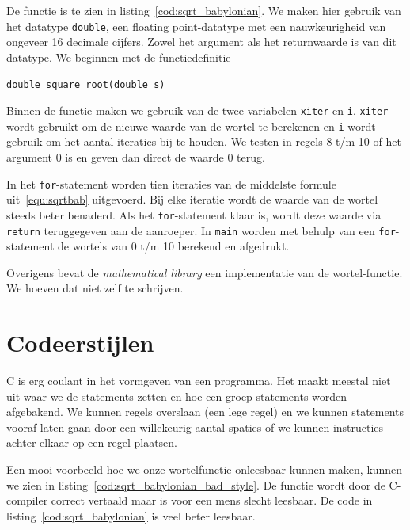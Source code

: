 De functie is te zien in listing~\ref{cod:sqrt_babylonian}. We maken hier gebruik van het datatype \texttt{double}, een floating point-datatype met een nauwkeurigheid van ongeveer 16 decimale cijfers. Zowel het argument als het returnwaarde is van dit datatype. We beginnen met de functiedefinitie

\hspace*{1em}\texttt{double square\_root(double s)}

Binnen de functie maken we gebruik van de twee variabelen \texttt{xiter} en \texttt{i}. \texttt{xiter} wordt gebruikt om de nieuwe waarde van de wortel te berekenen en \texttt{i} wordt gebruik om het aantal iteraties bij te houden.
We testen in regels 8 t/m 10 of het argument 0 is en geven dan direct de waarde 0 terug.


In het \texttt{for}-statement worden tien iteraties van de middelste formule uit~\eqref{equ:sqrtbab} uitgevoerd. Bij elke iteratie wordt de waarde van de wortel steeds beter benaderd. Als het \texttt{for}-statement klaar is, wordt deze waarde via \texttt{return} teruggegeven aan de aanroeper. In \texttt{main} worden met behulp van een \texttt{for}-statement de wortels van 0 t/m 10 berekend en afgedrukt.

Overigens bevat de \textsl{mathematical library} een implementatie van de wortel-functie. We hoeven dat niet zelf te schrijven.


\section{Codeerstijlen}
C is erg coulant in het vormgeven van een programma. Het maakt meestal niet uit waar we de statements zetten en hoe een groep statements worden afgebakend. We kunnen regels overslaan (een lege regel) en we kunnen statements vooraf laten gaan door een willekeurig aantal spaties of we kunnen instructies achter elkaar op een regel plaatsen.

Een mooi voorbeeld hoe we onze wortelfunctie onleesbaar kunnen maken, kunnen we zien in listing~\ref{cod:sqrt_babylonian_bad_style}. De functie wordt door de C-compiler correct vertaald maar is voor een mens slecht leesbaar. De code in listing~\ref{cod:sqrt_babylonian} is veel beter leesbaar.


